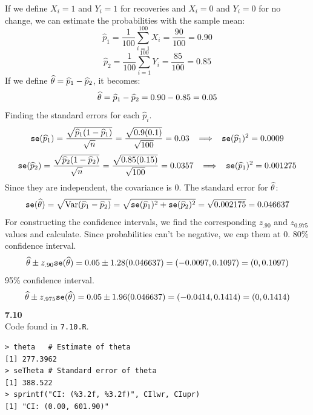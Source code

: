 If we define $X_i = 1$ and $Y_i = 1$ for recoveries and $X_i = 0$ and $Y_i = 0$
for no change, we can estimate the probabilities with the sample mean:
$$
\hat{p}_1 = \frac{1}{100}\sum_{i=1}^{100} X_i = \frac{90}{100} = 0.90
$$
$$
\hat{p}_2 = \frac{1}{100}\sum_{i=1}^{100} Y_i = \frac{85}{100} = 0.85
$$
If we define $\widehat{\theta} = \widehat{p}_1  - \widehat{p}_2$, it becomes:
$$
\widehat{\theta} = \widehat{p}_1  - \widehat{p}_2 = 0.90 - 0.85 = 0.05
$$
Finding the standard errors for each $\hat{p}_i$.
$$
\texttt{se}(\widehat{p}_1) = \frac{\sqrt{\widehat{p}_1(1 - \widehat{p}_1)}}{\sqrt{n}} = \frac{\sqrt{0.9(0.1)}}{\sqrt{100}} = 0.03
\;\;\implies\;\; \texttt{se}(\widehat{p}_1)^2 = 0.0009
$$
$$
\texttt{se}(\widehat{p}_2) = \frac{\sqrt{\widehat{p}_2(1 - \widehat{p}_2)}}{\sqrt{n}} = \frac{\sqrt{0.85(0.15)}}{\sqrt{100}} = 0.0357
\;\;\implies\;\; \texttt{se}(\widehat{p}_1)^2 = 0.001275
$$
Since they are independent, the covariance is 0. The standard error for $\widehat{\theta}$:
$$
\texttt{se}(\widehat{\theta}) = \sqrt{\text{Var}(\widehat{p}_1 - \widehat{p}_2)} = \sqrt{\texttt{se}(\widehat{p}_1)^2 + \texttt{se}(\widehat{p}_2)^2}
= \sqrt{0.002175} = 0.046637
$$
For constructing the confidence intervals, we find the corresponding $z_{.90}$ and $z_{0.975}$ values
and calculate. Since probabilities can't be negative, we cap them at 0.
80\% confidence interval.
$$
\widehat{\theta} \pm z_{.90}\texttt{se}(\widehat{\theta})  = 0.05 \pm 1.28(0.046637) = (-0.0097, 0.1097) = (0, 0.1097)
$$
95\% confidence interval.
$$
\widehat{\theta} \pm z_{.975}\texttt{se}(\widehat{\theta})  = 0.05 \pm 1.96(0.046637) = (-0.0414, 0.1414) = (0, 0.1414)
$$
\textbf{7.10}\\  %
Code found in \texttt{7.10.R}.
\begin{lstlisting}[style=RSyntax, title=R]
> theta   # Estimate of theta
[1] 277.3962
> seTheta # Standard error of theta
[1] 388.522
> sprintf("CI: (%3.2f, %3.2f)", CIlwr, CIupr)
[1] "CI: (0.00, 601.90)"
\end{lstlisting}





